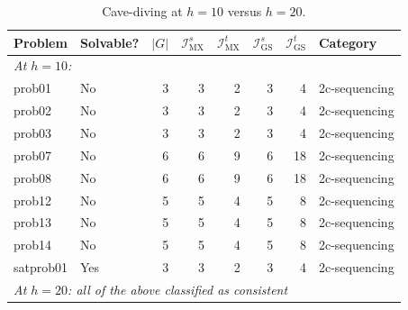 \begin{table}[ht]
    \centering
    \small
    \begin{tabular}{llr rrrr l}
        \toprule
        \textbf{Problem} & \textbf{Solvable?}          & $|G|$
                         & $\mathcal{I}^s_{\text{MX}}$ & $\mathcal{I}^t_{\text{MX}}$
                         & $\mathcal{I}^s_{\text{GS}}$ & $\mathcal{I}^t_{\text{GS}}$
                         & \textbf{Category}                                                                          \\
        \midrule
        \multicolumn{8}{l}{\textit{At $h = 10$:}}                                                                     \\
        prob01           & No                          & 3                           & 3 & 2 & 3 & 4  & 2c-sequencing \\
        prob02           & No                          & 3                           & 3 & 2 & 3 & 4  & 2c-sequencing \\
        prob03           & No                          & 3                           & 3 & 2 & 3 & 4  & 2c-sequencing \\
        prob07           & No                          & 6                           & 6 & 9 & 6 & 18 & 2c-sequencing \\
        prob08           & No                          & 6                           & 6 & 9 & 6 & 18 & 2c-sequencing \\
        prob12           & No                          & 5                           & 5 & 4 & 5 & 8  & 2c-sequencing \\
        prob13           & No                          & 5                           & 5 & 4 & 5 & 8  & 2c-sequencing \\
        prob14           & No                          & 5                           & 5 & 4 & 5 & 8  & 2c-sequencing \\
        satprob01        & Yes                         & 3                           & 3 & 2 & 3 & 4  & 2c-sequencing \\
        \midrule
        \multicolumn{8}{l}{\textit{At $h = 20$: all of the above classified as consistent}}                           \\
        \bottomrule
    \end{tabular}
    \caption{Cave-diving at $h = 10$ versus $h = 20$.}
    \label{tab:horizon_cavediving}
\end{table}

